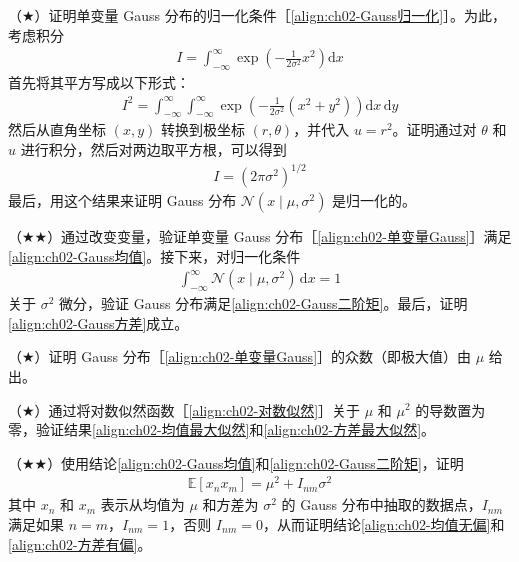 \documentclass[../../main.tex]{subfiles}
\begin{document}
\begin{exercise}\label{exercise:ch02-12}
（$\bigstar$）证明单变量 Gauss 分布的归一化条件［\eqref{align:ch02-Gauss归一化}］。为此，考虑积分
\begin{align}
  I = \int_{-\infty}^{\infty}\exp\left(-\frac{1}{2\sigma^{2}}x^{2}\right)\mathrm{d}x
  \label{align:ch02-Gauss积分}
\end{align}
首先将其平方写成以下形式：
\begin{align}
  I^{2} = \int_{-\infty}^{\infty}\!\!\int_{-\infty}^{\infty}\exp\left(-\frac{1}{2\sigma^{2}}(x^{2}+y^{2})\right)\mathrm{d}x\,\mathrm{d}y
  \label{align:ch02-Gauss积分平方}
\end{align}
然后从直角坐标 $(x,y)$ 转换到极坐标 $(r,\theta)$，并代入 $u=r^{2}$。证明通过对 $\theta$ 和 $u$ 进行积分，然后对两边取平方根，可以得到
\begin{align}
  I = \left(2\pi\sigma^{2}\right)^{1/2}
  \label{align:ch02-Gauss积分值}
\end{align}
最后，用这个结果来证明 Gauss 分布 $\mathcal{N}(x\mid\mu,\sigma^{2})$ 是归一化的。
\end{exercise}

\begin{exercise}\label{exercise:ch02-13}
（$\bigstar\bigstar$）通过改变变量，验证单变量 Gauss 分布［\eqref{align:ch02-单变量Gauss}］满足\eqref{align:ch02-Gauss均值}。接下来，对归一化条件
\begin{align}
  \int_{-\infty}^{\infty}\mathcal{N}(x\mid\mu,\sigma^{2})\,\mathrm{d}x = 1
  \label{align:ch02-归一化条件}
\end{align}
关于 $\sigma^{2}$ 微分，验证 Gauss 分布满足\eqref{align:ch02-Gauss二阶矩}。最后，证明\eqref{align:ch02-Gauss方差}成立。
\end{exercise}

\begin{exercise}\label{exercise:ch02-14}
（$\bigstar$）证明 Gauss 分布［\eqref{align:ch02-单变量Gauss}］的众数（即极大值）由 $\mu$ 给出。
\end{exercise}

\begin{exercise}\label{exercise:ch02-15}
（$\bigstar$）通过将对数似然函数［\eqref{align:ch02-对数似然}］关于 $\mu$ 和 $\mu^{2}$ 的导数置为零，验证结果\eqref{align:ch02-均值最大似然}和\eqref{align:ch02-方差最大似然}。
\end{exercise}

\begin{exercise}\label{exercise:ch02-16}
（$\bigstar\bigstar$）使用结论\eqref{align:ch02-Gauss均值}和\eqref{align:ch02-Gauss二阶矩}，证明
\begin{align}
  \mathbb{E}\left[x_nx_m\right] = \mu^{2} + I_{nm}\sigma^{2}
  \label{align:ch02-混合矩}
\end{align}
其中 $x_n$ 和 $x_m$ 表示从均值为 $\mu$ 和方差为 $\sigma^{2}$ 的 Gauss 分布中抽取的数据点，$I_{nm}$ 满足如果 $n=m$，$I_{nm}=1$，否则 $I_{nm}=0$，从而证明结论\eqref{align:ch02-均值无偏}和\eqref{align:ch02-方差有偏}。
\end{exercise}
\end{document}
